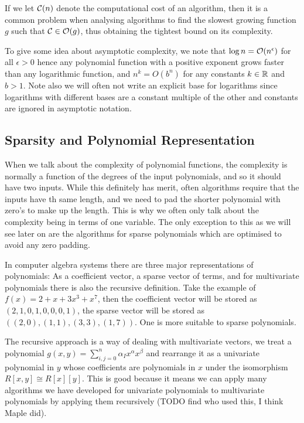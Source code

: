 If we let $\mathcal C(n)$ denote the computational cost of an algorithm, then it is a common problem when analysing algorithms to find the slowest growing function $g$ such that $\mathcal C \in \mathcal O(g)$, thus obtaining the tightest bound on its complexity.

To give some idea about asymptotic complexity, we note that $\log n = \mathcal O(n^\epsilon)$ for all $\epsilon > 0$ hence any polynomial function with a positive exponent grows faster than any logarithmic function, and $n^k = O(b^n)$ for any constants $k \in {\mathbb R}$ and $b > 1$. Note also we will often not write an explicit base for logarithms since logarithms with different bases are a constant multiple of the other and constants are ignored in asymptotic notation. 

\subsection{Sparsity and Polynomial Representation}

When we talk about the complexity of polynomial functions, the complexity is normally a function of the degrees of the input polynomials, and so it should have two inputs. While this definitely has merit, often algorithms require that the inputs have th same length, and we need to pad the shorter polynomial with zero's to make up the length. This is why we often only talk about the complexity being in terms of one variable. The only exception to this as we will see later on are the algorithms for sparse polynomials which are optimised to avoid any zero padding.

In computer algebra systems there are three major representations of polynomials: As a coefficient vector, a sparse vector of terms, and for multivariate polynomials there is also the recursive definition. Take the example of $f(x) = 2 + x + 3x^3 + x^7$, then the coefficient vector will be stored as $(2, 1, 0, 1, 0, 0, 0, 1)$, the sparse vector will be stored as $((2, 0), (1, 1), (3, 3), (1, 7))$. One is more suitable to sparse polynomials.

The recursive approach is a way of dealing with multivariate vectors, we treat a polynomial $g(x, y) = \sum_{i, j = 0}^n \alpha_I x^\alpha x^\beta$ and rearrange it as a univariate polynomial in $y$ whose coefficients are polynomials in $x$ under the isomorphism $R[x, y] \cong R[x][y]$. This is good because it means we can apply many algorithms we have developed for univariate polynomials to multivariate polynomials by applying them recursively (TODO find who used this, I think Maple did).

